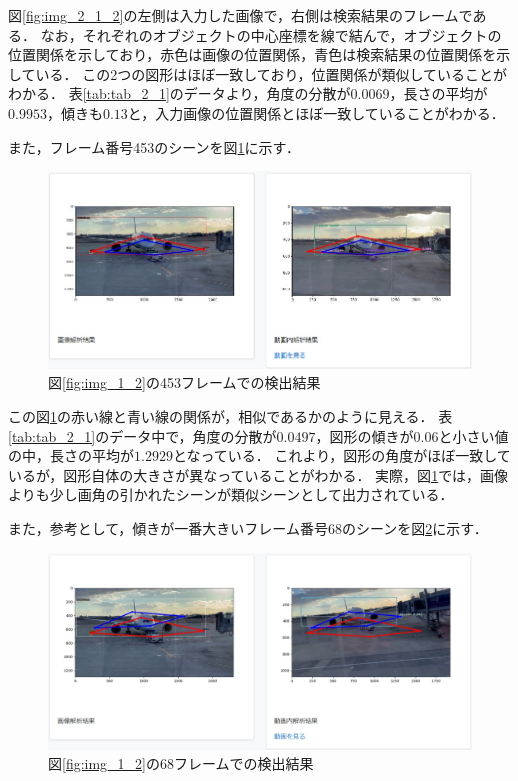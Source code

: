 \documentclass[a4j,12pt,dvipdfmx]{jreport}
\begin{document}
図\ref{fig:img_2_1_2}の左側は入力した画像で，右側は検索結果のフレームである．
なお，それぞれのオブジェクトの中心座標を線で結んで，オブジェクトの位置関係を示しており，赤色は画像の位置関係，青色は検索結果の位置関係を示している．
この2つの図形はほぼ一致しており，位置関係が類似していることがわかる．
表\ref{tab:tab_2_1}のデータより，角度の分散が$0.0069$，長さの平均が$0.9953$，傾きも$0.13$と，入力画像の位置関係とほぼ一致していることがわかる．

また，フレーム番号453のシーンを図\ref{fig:img_2_1_3}に示す．

\begin{figure}[b]
  \centering
  \includegraphics[width=13cm]{image/result_2_1_3.jpg}
  \caption{図\ref{fig:img_1_2}の453フレームでの検出結果}
  \label{fig:img_2_1_3}
\end{figure}

この図\ref{fig:img_2_1_3}の赤い線と青い線の関係が，相似であるかのように見える．
表\ref{tab:tab_2_1}のデータ中で，角度の分散が$0.0497$，図形の傾きが$0.06$と小さい値の中，長さの平均が$1.2929$となっている．
これより，図形の角度がほぼ一致しているが，図形自体の大きさが異なっていることがわかる．
実際，図\ref{fig:img_2_1_3}では，画像よりも少し画角の引かれたシーンが類似シーンとして出力されている．

また，参考として，傾きが一番大きいフレーム番号68のシーンを図\ref{fig:img_2_1_4}に示す．
\begin{figure}[b]
  \centering
  \includegraphics[width=13cm]{image/result_2_1_4.jpg}
  \caption{図\ref{fig:img_1_2}の68フレームでの検出結果}
  \label{fig:img_2_1_4}
\end{figure}
\end{document}
